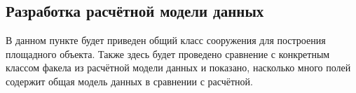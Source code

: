 \subsection{\large{Разработка расчётной модели данных}}

В данном пункте будет приведен общий класс сооружения для построения площадного объекта.
Также здесь будет проведено сравнение с конкретным классом факела из расчётной модели данных
и показано, насколько много полей содержит общая модель данных в сравнении с расчётной.